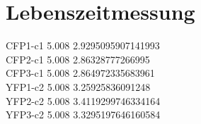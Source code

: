 \section{Lebenszeitmessung}
\label{sec:lebenszeit}

CFP1-c1 5.008 2.9295095907141993 \\
CFP2-c1 5.008 2.86328777266995 \\
CFP3-c1 5.008 2.864972335683961 \\
YFP1-c2 5.008 3.25925836091248 \\
YFP2-c2 5.008 3.4119299746334164 \\
YFP3-c2 5.008 3.3295197646160584 \\